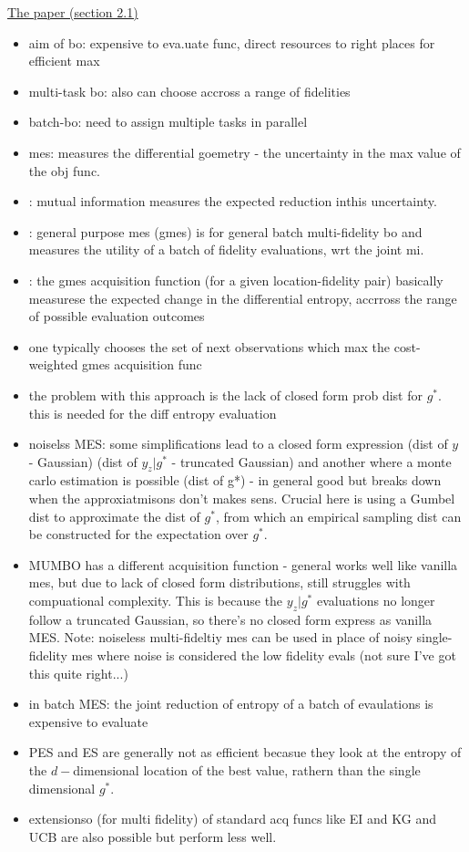 \documentclass{article}
\begin{document}
\underline{The paper (section 2.1)}
  \begin{itemize}
  \item aim of bo: expensive to eva.uate func, direct resources to right places for efficient max
  \item multi-task bo: also can choose accross a range of fidelities
  \item batch-bo: need to assign multiple tasks in parallel
  \item mes: measures the differential goemetry - the uncertainty in the max value of the obj func.
  \item: mutual information measures the expected reduction inthis uncertainty.
  \item: general purpose mes (gmes) is for general batch multi-fidelity bo and measures the utility of a batch of fidelity evaluations, wrt the joint mi.
  \item: the gmes acquisition function (for a given location-fidelity pair)  basically measurese the expected change in the differential entropy, accrross the range of possible evaluation outcomes
  \item one typically chooses the set of next observations which max the cost-weighted gmes acquisition func
  \item the problem with this approach is the lack of closed form prob dist for $g^{*}$. this is needed for the diff entropy evaluation
  \item noiselss MES: some simplifications lead to a closed form expression (dist of $y$ - Gaussian) (dist of $y_{z}|g^{*}$ - truncated Gaussian) and another where a monte carlo estimation is possible (dist of g*) - in general good but breaks down when the approxiatmisons don't makes sens. Crucial here is using a Gumbel dist to approximate the dist of $g^{*}$, from which an empirical sampling dist can be constructed for the expectation over $g^{*}$. 
  \item MUMBO has a different acquisition function - general works well like vanilla mes, but due to lack of closed form distributions, still struggles with compuational complexity. This is because the $y_{z}|g^{*}$ evaluations no longer follow a truncated Gaussian, so there's no closed form express as vanilla MES. Note: noiseless multi-fideltiy mes can be used in place of noisy single-fidelity mes where noise is considered the low fidelity evals (not sure I've got this quite right...)
  \item in batch MES: the joint reduction of entropy of a batch of evaulations is expensive to evaluate
  \item PES and ES are generally not as efficient becasue they look at the entropy of the $d-$dimensional location of the best value, rathern than the single dimensional $g^{*}$.
  \item extensionso (for multi fidelity)  of standard acq funcs like EI and KG and UCB are also possible but perform less well. 
  \end{itemize}
\end{document}
